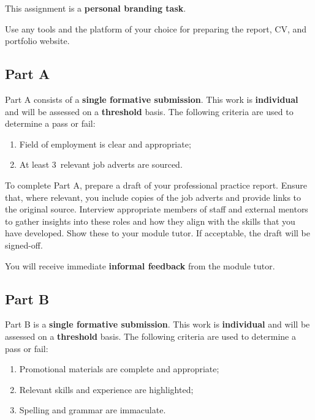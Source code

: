 \documentclass{../../fal_assignment}
\newcommand{\minReferenceCount}{3}
\begin{document}
This assignment is a \textbf{personal branding task}. 


Use any tools and the platform of your choice for preparing the report, CV, and portfolio website.

\subsection*{Part A}

Part A consists of a \textbf{single formative submission}. This work is \textbf{individual} and will be assessed on a \textbf{threshold} basis. The following criteria are used to determine a pass or fail:

\begin{enumerate}[label=(\alph*)]
	\item Field of employment is clear and appropriate;
	\item At least \minReferenceCount ~relevant job adverts are sourced.
\end{enumerate}

To complete Part A, prepare a draft of your professional practice report. Ensure that, where relevant, you include copies of the job adverts and provide links to the original source.  Interview appropriate members of staff and external mentors to gather insights into these roles and how they align with the skills that you have developed. Show these to your module tutor.  If acceptable, the draft will be signed-off. 

You will receive immediate \textbf{informal feedback} from the module tutor.

\subsection*{Part B}

Part B is a \textbf{single formative submission}. This work is \textbf{individual} and will be assessed on a \textbf{threshold} basis. The following criteria are used to determine a pass or fail:

\begin{enumerate}[label=(\alph*)]
	\item Promotional materials are complete and appropriate;
	\item Relevant skills and experience are highlighted;
	\item Spelling and grammar are immaculate.
\end{enumerate}
\end{document}
